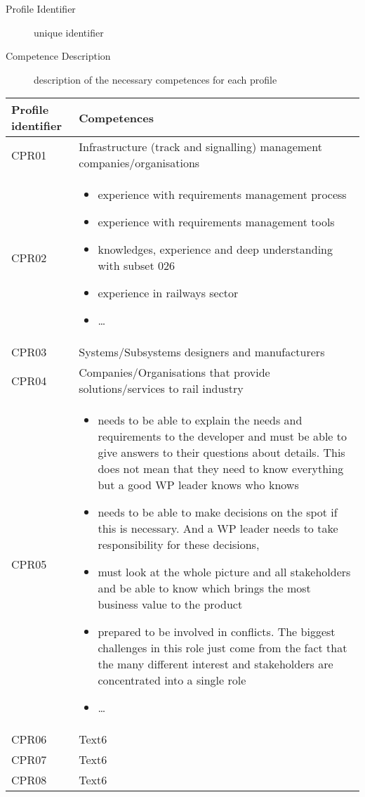 \documentclass{template/openetcs_article}
\begin{document}
\begin{description}
\item[Profile Identifier] unique identifier
\item[Competence Description] description of the necessary competences for each profile
\end{description}

\begin{flushleft}
\tablefirsthead{}
\tablehead{}
\tabletail{}
\tablelasttail{}
\begin{supertabular}{|m{3cm}|m{12cm}|}
\hline
{}
Profile identifier&
Competences\\\hline
CPR01 &
Infrastructure (track and signalling) management companies/organisations\\\hline
CPR02 &
\begin{itemize}
\item experience with requirements management process
\item experience with requirements management tools
\item knowledges, experience and deep understanding with subset 026
\item experience in railways sector
\item {\dots}
\end{itemize}\\\hline
CPR03 &
Systems/Subsystems designers and manufacturers\\\hline
CPR04 &
Companies/Organisations that provide solutions/services to rail industry\\\hline
CPR05 &
\begin{itemize}
\item needs to be able to explain the needs and requirements to the developer and must be able to give answers to their questions about details. This does not mean that they need to know everything but a good WP leader knows who knows
\item needs to be able to make decisions on the spot if this is necessary. And a WP leader needs to take responsibility for these decisions,
\item must look at the whole picture and all stakeholders and be able to know which brings the most business value to the product
\item prepared to be involved in conflicts. The biggest challenges in this role just come from the fact that the many different interest and stakeholders are concentrated into a single role
\item {\dots}
\end{itemize}\\\hline
CPR06 &
Text6\\\hline
CPR07 &
Text6\\\hline
CPR08 &
Text6\\\hline
\end{supertabular}
\end{flushleft}
\end{document}
